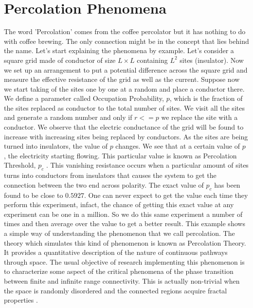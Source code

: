 \section{Percolation Phenomena}
	The word 'Percolation' comes from the coffee percolator but it has nothing to do with	coffee brewing. The only connection might be in the concept that lies behind the name.	Let's start explaining the phenomena by example. Let's consider a square grid made of conductor of	size $L\times L$ containing $L^2$ sites (insulator).%
    Now we set up an arrangement to put a potential difference across the square grid and measure the effective resistance of the grid as well	as the current. Suppose now we start taking of the sites one by one at a random and place a conductor there. We	define a parameter called Occupation Probability, $p$, which is the fraction of the  sites replaced as conductor to the total number of sites. We visit all the sites and generate a random number and only if $r <= p$ we replace the site with a conductor. We observe that the electric	conductance of the grid will be found to increase with increasing sites being replaced by conductors. As the sites are being turned into insulators, the value of $p$ changes. We see that at a	certain value of $p$ , the electricity starting flowing. This particular value is known as Percolation Threshold, $p_c$ . This vanishing resistance occurs when a particular amount of sites turns into conductors from insulators that causes the system to get the connection	between the two end across polarity. The exact value of $p_c$ has been found to be close to $0.5927$. One can never expect to get the	value each time they perform this experiment, infact, the chance of getting this exact	value at any experiment can be one in a million. So we do this same experiment a	number of times and then average over the value to get a better result. This example shows a simple way of understanding the phenomenon that we call
	percolation. The theory which simulates this kind of phenomenon is known as Percolation Theory. It provides a quantitative description of the nature of continuous pathways through space. The usual objective of research implementing this phenomenon	is to characterize some aspect of the critical phenomena of the phase transition between finite and infinite range connectivity. This is actually non-trivial when the space	is randomly disordered and the connected regions acquire fractal properties \cite{Zimm1949, Mandelbrot1983}.
